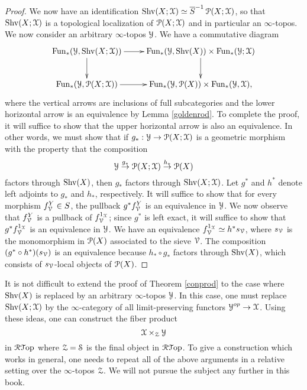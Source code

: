 \begin{proof}
We now have an identification $\operatorname{Shv}(X; \operatorname{\mathcal{X}}) \simeq \overline{S}^{-1} \operatorname{\mathcal{P}}(X; \operatorname{\mathcal{X}})$, so that
$\operatorname{Shv}(X; \operatorname{\mathcal{X}})$ is a topological localization of $\operatorname{\mathcal{P}}(X; \operatorname{\mathcal{X}})$ and in particular an $\infty$-topos. 
We now consider an arbitrary $\infty$-topos $\operatorname{\mathcal{Y}}$. We have a commutative diagram
$$ \xymatrix{ \Fun_{\ast}(\calY, \Shv(X; \calX)) \ar[r] \ar[d] & \Fun_{\ast}(\calY, \Shv(X)) \times \Fun_{\ast}(\calY; \calX) \ar[d] \\
\Fun_{\ast}(\calY, \calP(X; \calX)) \ar[r] & \Fun_{\ast}(\calY,\calP(X)) \times \Fun_{\ast}(\calY, \calX), } $$
where the vertical arrows are inclusions of full subcategories and the lower horizontal arrow is an equivalence by Lemma \ref{goldenrod}. To complete the proof, it will suffice to show that the upper horizontal arrow is also an equivalence. In other words, we must show that if
$g_{\ast}: \operatorname{\mathcal{Y}} \rightarrow \operatorname{\mathcal{P}}(X; \operatorname{\mathcal{X}})$ is a geometric morphism with the property that
the composition 
$$ \operatorname{\mathcal{Y}} \stackrel{g_{\ast}}{\rightarrow} \operatorname{\mathcal{P}}(X; \operatorname{\mathcal{X}}) \stackrel{h_{\ast}}{\rightarrow} \operatorname{\mathcal{P}}(X) $$
factors through $\operatorname{Shv}(X)$, then $g_{\ast}$ factors through $\operatorname{Shv}(X; \operatorname{\mathcal{X}})$.
Let $g^{\ast}$ and $h^{\ast}$ denote left adjoints to $g_{\ast}$ and $h_{\ast}$, respectively. It will suffice to show that for every
morphism $f_{\operatorname{\mathcal V}}^{Y} \in S$, the pullback $g^{\ast} f_{\operatorname{\mathcal V}}^{Y}$ is an equivalence in $\operatorname{\mathcal{Y}}$.
We now observe that $f_{\operatorname{\mathcal V}}^{Y}$ is a pullback of $f_{\operatorname{\mathcal V}}^{1_{\operatorname{\mathcal{X}}}}$; since
$g^{\ast}$ is left exact, it will suffice to show that $g^{\ast} f_{\operatorname{\mathcal V}}^{1_{\operatorname{\mathcal{X}}}}$
is an equivalence in $\operatorname{\mathcal{Y}}$. We have an equivalence $f_{\operatorname{\mathcal V}}^{1_{\operatorname{\mathcal{X}}}} \simeq h^{\ast} s_{\operatorname{\mathcal V}}$, where $s_{\operatorname{\mathcal V}}$ is the monomorphism in $\operatorname{\mathcal{P}}(X)$ associated to the sieve $\operatorname{\mathcal V}$.
The composition $(g^{\ast} \circ h^{\ast})( s_{\operatorname{\mathcal V}} )$ is an equivalence because 
$h_{\ast} \circ g_{\ast}$ factors through $\operatorname{Shv}(X)$, which consists of $s_{\operatorname{\mathcal V}}$-local objects
of $\operatorname{\mathcal{P}}(X)$.
\end{proof}

\begin{remark}
It is not difficult to extend the proof of Theorem \ref{conprod} to the case where
$\operatorname{Shv}(X)$ is replaced by an arbitrary $\infty$-topos $\operatorname{\mathcal{Y}}$. In this case, one must replace
$\operatorname{Shv}(X; \operatorname{\mathcal{X}})$ by the $\infty$-category of all limit-preserving functors $\operatorname{\mathcal{Y}}^{op} \rightarrow \operatorname{\mathcal{X}}$. Using these ideas, one can construct the fiber product
$$ \operatorname{\mathcal{X}} \times_{ \operatorname{\mathcal{Z}}} \operatorname{\mathcal{Y}}$$ in $\operatorname{\mathcal{R}{\mathcal T}op}$ where
$\operatorname{\mathcal{Z}} = \operatorname{\mathcal{S}}$ is the final object in $\operatorname{\mathcal{R}{\mathcal T}op}$. To give a construction which works in general,  one needs to repeat all of the above arguments in a relative setting over the $\infty$-topos $\operatorname{\mathcal{Z}}$. We will not pursue the subject any further in this book.
\end{remark}

